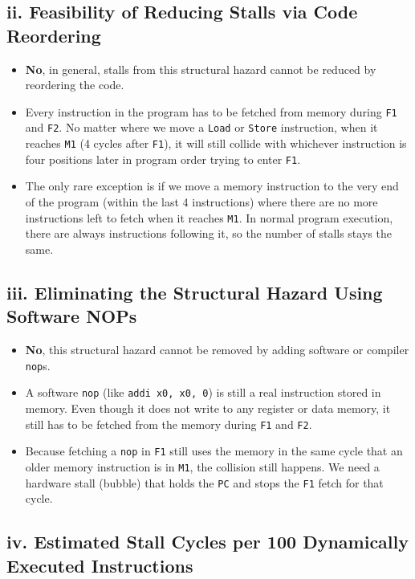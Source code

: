 \documentclass[11pt, a4paper]{article}
\begin{document}
\subsection*{ii. Feasibility of Reducing Stalls via Code Reordering}
\begin{itemize}[noitemsep, topsep=2pt]
    \item \textbf{No}, in general, stalls from this structural hazard cannot be reduced by reordering the code.
    \item Every instruction in the program has to be fetched from memory during \texttt{F1} and \texttt{F2}. No matter where we move a \texttt{Load} or \texttt{Store} instruction, when it reaches \texttt{M1} (4 cycles after \texttt{F1}), it will still collide with whichever instruction is four positions later in program order trying to enter \texttt{F1}.
    \item The only rare exception is if we move a memory instruction to the very end of the program (within the last 4 instructions) where there are no more instructions left to fetch when it reaches \texttt{M1}. In normal program execution, there are always instructions following it, so the number of stalls stays the same.
\end{itemize}

\subsection*{iii. Eliminating the Structural Hazard Using Software NOPs}
\begin{itemize}[noitemsep, topsep=2pt]
    \item \textbf{No}, this structural hazard cannot be removed by adding software or compiler \texttt{nop}s.
    \item A software \texttt{nop} (like \texttt{addi x0, x0, 0}) is still a real instruction stored in memory. Even though it does not write to any register or data memory, it still has to be fetched from the memory during \texttt{F1} and \texttt{F2}.
    \item Because fetching a \texttt{nop} in \texttt{F1} still uses the memory in the same cycle that an older memory instruction is in \texttt{M1}, the collision still happens. We need a hardware stall (bubble) that holds the \texttt{PC} and stops the \texttt{F1} fetch for that cycle.
\end{itemize}

\subsection*{iv. Estimated Stall Cycles per 100 Dynamically Executed Instructions}
\end{document}
